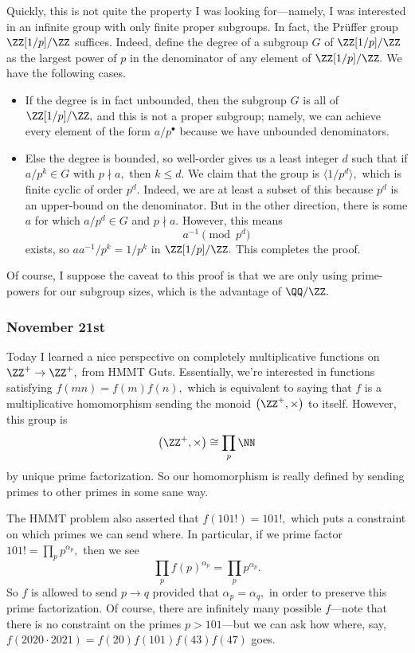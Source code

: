 Quickly, this is not quite the property I was looking for---namely, I was interested in an infinite group with only finite proper subgroups. In fact, the Pr\"uffer group $\ZZ[1/p]/\ZZ$ suffices. Indeed, define the degree of a subgroup $G$ of $\ZZ[1/p]/\ZZ$ as the largest power of $p$ in the denominator of any element of $\ZZ[1/p]/\ZZ.$ We have the following cases.
\begin{itemize}
    \item If the degree is in fact unbounded, then the subgroup $G$ is all of $\ZZ[1/p]/\ZZ,$ and this is not a proper subgroup; namely, we can achieve every element of the form $a/p^\bullet$ because we have unbounded denominators.
    \item Else the degree is bounded, so well-order gives us a least integer $d$ such that if $a/p^k\in G$ with $p\nmid a,$ then $k\le d.$ We claim that the group is $\langle1/p^d\rangle,$ which is finite cyclic of order $p^d.$ Indeed, we are at least a subset of this because $p^d$ is an upper-bound on the denominator. But in the other direction, there is some $a$ for which $a/p^d\in G$ and $p\nmid a.$ However, this means
    \[a^{-1}\pmod{p^d}\]
    exists, so $aa^{-1}/p^k=1/p^k$ in $\ZZ[1/p]/\ZZ.$ This completes the proof.
\end{itemize}
Of course, I suppose the caveat to this proof is that we are only using prime-powers for our subgroup sizes, which is the advantage of $\QQ/\ZZ.$

\subsubsection{November 21st}
Today I learned a nice perspective on completely multiplicative functions on $\ZZ^+\to\ZZ^+,$ from HMMT Guts. Essentially, we're interested in functions satisfying $f(mn)=f(m)f(n),$ which is equivalent to saying that $f$ is a multiplicative homomorphism sending the monoid $\left(\ZZ^+,\times\right)$ to itself. However, this group is
\[\left(\ZZ^+,\times\right)\cong\prod_p\NN\]
by unique prime factorization. So our homomorphism is really defined by sending primes to other primes in some sane way.

The HMMT problem also asserted that $f(101!)=101!,$ which puts a constraint on which primes we can send where. In particular, if we prime factor $101!=\prod_pp^{\alpha_p},$ then we see
\[\prod_pf(p)^{\alpha_p}=\prod_pp^{\alpha_p}.\]
So $f$ is allowed to send $p\to q$ provided that $\alpha_p=\alpha_q,$ in order to preserve this prime factorization. Of course, there are infinitely many possible $f$---note that there is no constraint on the primes $p>101$---but we can ask how where, say, $f(2020\cdot2021)=f(20)f(101)f(43)f(47)$ goes.

